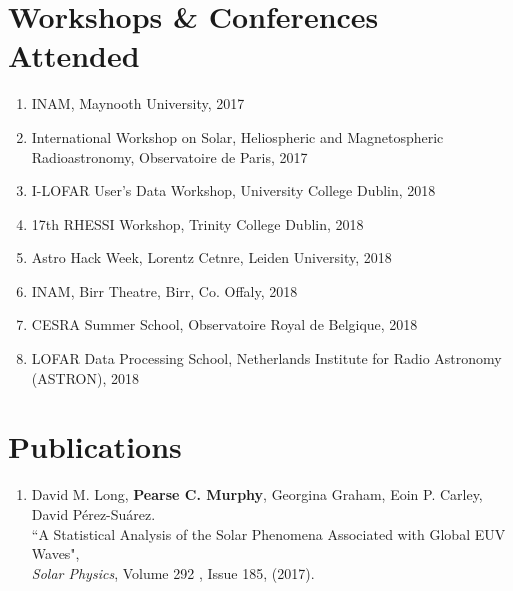 \begin{singlespace}
%
\section*{Workshops \& Conferences Attended}
\begin{enumerate}
\item INAM, Maynooth University, 2017
\item International Workshop on Solar, Heliospheric and Magnetospheric Radioastronomy, Observatoire de Paris, 2017
\item I-LOFAR User's Data Workshop, University College Dublin, 2018
\item 17th RHESSI Workshop, Trinity College Dublin, 2018
\item Astro Hack Week, Lorentz Cetnre, Leiden University, 2018
\item INAM, Birr Theatre, Birr, Co. Offaly, 2018
\item CESRA Summer School, Observatoire Royal de Belgique, 2018 
\item LOFAR Data Processing School, Netherlands Institute for Radio Astronomy (ASTRON), 2018
\end{enumerate}

\section*{Publications}
\begin{enumerate}
\item David M. Long, \textbf{Pearse C. Murphy}, Georgina Graham, Eoin P. Carley, David P\'{e}rez-Su\'{a}rez.
\\ ``A Statistical Analysis of the Solar Phenomena Associated with Global EUV Waves",
\\ \textit{Solar Physics}, Volume 292 , Issue 185, (2017).
\end{enumerate}




\end{singlespace}





